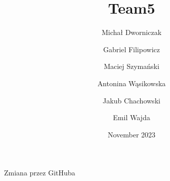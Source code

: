 \documentclass{article}
\title{Team5}
\author{Michał Dworniczak \and Gabriel Filipowicz \and Maciej Szymański \and Antonina Wąsikowska \and Jakub Chachowski \and Emil Wajda}
\date{November 2023}
\begin{document}
\maketitle








Zmiana przez GitHuba
\end{document}

